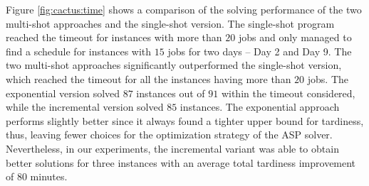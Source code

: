 \documentclass[submission,copyright,creativecommons]{eptcs}
\newcommand{\jss}{MPF-JSS\xspace}
\begin{document}
Figure \ref{fig:cactus:time} shows a comparison of the solving performance of the two multi-shot approaches and the single-shot version. The single-shot program reached the timeout for instances with more than $20$ jobs and only managed to find a schedule for instances with $15$ jobs for two days -- Day 2 and Day 9.
%
The two multi-shot approaches significantly outperformed the single-shot version, which reached the timeout for all the instances having more than $20$ jobs. The exponential version solved $87$ instances out of $91$ within the timeout considered, while the incremental version solved $85$ instances. The exponential approach performs slightly better since it always found a tighter upper bound for tardiness, thus, leaving fewer choices for the optimization strategy of the ASP solver. Nevertheless, 
in our experiments, the incremental variant was able to obtain better solutions for three instances with an average total tardiness improvement of 80 minutes.

%



\end{document}
